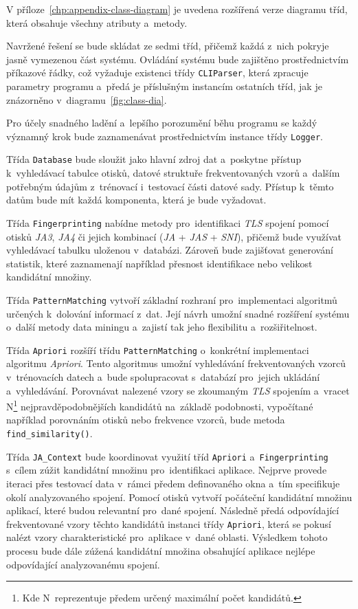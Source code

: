 V příloze~\ref{chp:appendix-class-diagram} je uvedena rozšířená verze diagramu tříd, která obsahuje všechny atributy a~metody.

Navržené řešení se bude skládat ze sedmi tříd, přičemž každá z~nich pokryje jasně vymezenou část systému. Ovládání systému bude zajištěno prostřednictvím příkazové řádky, což vyžaduje existenci třídy \texttt{CLIParser}, která zpracuje parametry programu a~předá je příslušným instancím ostatních tříd, jak je znázorněno v~diagramu~\ref{fig:class-dia}.

Pro účely snadného ladění a~lepšího porozumění běhu programu se každý významný krok bude zaznamenávat prostřednictvím instance třídy \texttt{Logger}.

Třída \texttt{Database} bude sloužit jako hlavní zdroj dat a~poskytne přístup k~vyhledávací tabulce otisků, datové struktuře frekventovaných vzorů a~dalším potřebným údajům z~trénovací i~testovací části datové sady. Přístup k~těmto datům bude mít každá komponenta, která je bude vyžadovat.

Třída \texttt{Fingerprinting} nabídne metody pro~identifikaci \textit{TLS} spojení pomocí otisků \textit{JA3}, \textit{JA4} či jejich kombinací (\textit{JA} + \textit{JAS} + \textit{SNI}), přičemž bude využívat vyhledávací tabulku uloženou v~databázi. Zároveň bude zajišťovat generování statistik, které zaznamenají například přesnost identifikace nebo velikost kandidátní množiny.

Třída \texttt{PatternMatching} vytvoří základní rozhraní pro~implementaci algoritmů určených k~dolování informací z~dat. Její návrh umožní snadné rozšíření systému o~další metody data miningu a~zajistí tak jeho flexibilitu a~rozšiřitelnost.

Třída \texttt{Apriori} rozšíří třídu \texttt{PatternMatching} o~konkrétní implementaci algoritmu \textit{Apriori}. Tento algoritmus umožní vyhledávání frekventovaných vzorců v~trénovacích datech a~bude spolupracovat s~databází pro~jejich ukládání a~vyhledávání. Porovnávat nalezené vzory se zkoumaným \textit{TLS} spojením a~vracet N\footnote{Kde N~reprezentuje předem určený maximální počet kandidátů.} nejpravděpodobnějších kandidátů na~základě podobnosti, vypočítané například porovnáním otisků nebo frekvence vzorců, bude metoda \texttt{find\_similarity()}.

Třída \texttt{JA\_Context} bude koordinovat využití tříd \texttt{Apriori} a~\texttt{Fingerprinting} s~cílem zúžit kandidátní množinu pro~identifikaci aplikace. Nejprve provede iteraci přes testovací data v~rámci předem definovaného okna a~tím specifikuje okolí analyzovaného spojení. Pomocí otisků vytvoří počáteční kandidátní množinu aplikací, které budou relevantní pro~dané spojení. Následně předá odpovídající frekventované vzory těchto kandidátů instanci třídy \texttt{Apriori}, která se pokusí nalézt vzory charakteristické pro~aplikace v~dané oblasti. Výsledkem tohoto procesu bude dále zúžená kandidátní množina obsahující aplikace nejlépe odpovídající analyzovanému spojení.

